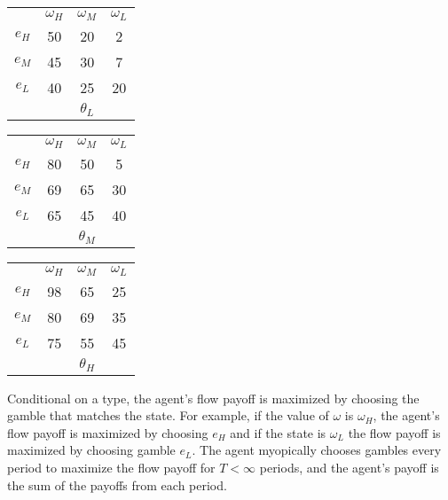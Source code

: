 \documentclass[
  12pt,
]{article}
\begin{document}
\begin{tabular}{ c|c|c|c|}
  
  \multicolumn{1}{c}{} & \multicolumn{1}{c}{$\omega_H$} & \multicolumn{1}{c}{$\omega_M$} & \multicolumn{1}{c}{$\omega_L$}\\
  \cline{2-4}
  $e_H$ & 50 & 20 & 2 \\
  \cline{2-4}
  $e_M$ & 45 & 30 & 7 \\
  \cline{2-4}
  $e_L$ & 40 & 25 & 20 \\
  \cline{2-4}
  \multicolumn{1}{c}{} & \multicolumn{1}{c}{} & \multicolumn{1}{c}{$\theta_L$} & \multicolumn{1}{c}{}\\
\end{tabular}
\hspace{.3cm} 
\begin{tabular}{ c|c|c|c|}
  
  \multicolumn{1}{c}{} & \multicolumn{1}{c}{$\omega_H$} & \multicolumn{1}{c}{$\omega_M$} & \multicolumn{1}{c}{$\omega_L$}\\
  \cline{2-4}
  $e_H$ & 80 & 50 & 5 \\
  \cline{2-4}
  $e_M$ & 69 & 65 & 30 \\
  \cline{2-4}
  $e_L$ & 65 & 45 & 40 \\
  \cline{2-4}
  \multicolumn{1}{c}{} & \multicolumn{1}{c}{} & \multicolumn{1}{c}{$\theta_M$} & \multicolumn{1}{c}{}\\
\end{tabular}
\hspace{.3cm} 
\begin{tabular}{ c|c|c|c|}
  
  \multicolumn{1}{c}{} & \multicolumn{1}{c}{$\omega_H$} & \multicolumn{1}{c}{$\omega_M$} & \multicolumn{1}{c}{$\omega_L$}\\
  \cline{2-4}
  $e_H$ & 98 & 65 & 25 \\
  \cline{2-4}
  $e_M$ & 80 & 69 & 35 \\
  \cline{2-4}
  $e_L$ & 75 & 55 & 45 \\
  \cline{2-4}
  \multicolumn{1}{c}{} & \multicolumn{1}{c}{} & \multicolumn{1}{c}{$\theta_H$} & \multicolumn{1}{c}{}\\
\end{tabular}

Conditional on a type, the agent's flow payoff is maximized by choosing
the gamble that matches the state. For example, if the value of
\(\omega\) is \(\omega_H\), the agent's flow payoff is maximized by
choosing \(e_H\) and if the state is \(\omega_L\) the flow payoff is
maximized by choosing gamble \(e_L\). The agent myopically chooses
gambles every period to maximize the flow payoff for \(T<\infty\)
periods, and the agent's payoff is the sum of the payoffs from each
period.
\end{document}
